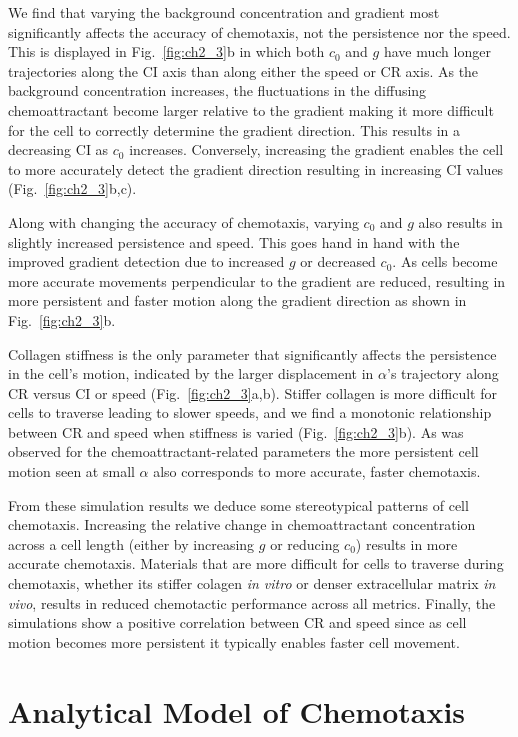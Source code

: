 We find that varying the background concentration and gradient most significantly affects the accuracy of chemotaxis, not the persistence nor the speed. This is displayed in Fig.\ \ref{fig:ch2_3}b in which both $c_0$ and $g$ have much longer trajectories along the CI axis than along either the speed or CR axis.
As the background concentration increases, the fluctuations in the diffusing chemoattractant become larger relative to the gradient making it more difficult for the cell to correctly determine the gradient direction. This results in a decreasing CI as $c_0$ increases. Conversely, increasing the gradient enables the cell to more accurately detect the gradient direction resulting in increasing CI values (Fig.\ \ref{fig:ch2_3}b,c).

Along with changing the accuracy of chemotaxis, varying $c_0$ and $g$ also results in slightly increased persistence and speed. This goes hand in hand with the improved gradient detection due to increased $g$ or decreased $c_0$. As cells become more accurate movements perpendicular to the gradient are reduced, resulting in more persistent and faster motion along the gradient direction as shown in Fig.\ \ref{fig:ch2_3}b.

Collagen stiffness is the only parameter that significantly affects the persistence in the cell's motion, indicated by the larger displacement in $\alpha$'s trajectory along CR versus CI or speed (Fig.\ \ref{fig:ch2_3}a,b). Stiffer collagen is more difficult for cells to traverse leading to slower speeds, and we find a monotonic relationship between CR and speed when stiffness is varied (Fig.\ \ref{fig:ch2_3}b). As was observed for the chemoattractant-related parameters the more persistent cell motion seen at small $\alpha$ also corresponds to more accurate, faster chemotaxis.

From these simulation results we deduce some stereotypical patterns of cell chemotaxis. Increasing the relative change in chemoattractant concentration across a cell length (either by increasing $g$ or reducing $c_0$) results in more accurate chemotaxis. Materials that are more difficult for cells to traverse during chemotaxis, whether its stiffer colagen \textit{in vitro} or denser extracellular matrix \textit{in vivo}, results in reduced chemotactic performance across all metrics. Finally, the simulations show a positive correlation between CR and speed since as cell motion becomes more persistent it typically enables faster cell movement.

\section{Analytical Model of Chemotaxis}

